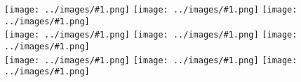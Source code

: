\documentclass{scrartcl}
\newcommand{\card}[1]{\texttt{[image: ../images/\#1.png]}}
\begin{document}
    \centering

    \card{Mystical_Space_Typhoon}%
    \card{Mystical_Space_Typhoon}%
    \card{Mystical_Space_Typhoon}
    \\[-0.34mm]
    \card{Solemn_Strike}%
    \card{Solemn_Strike}%
    \card{Solemn_Strike}
    \\[-0.34mm]
    \card{Effect_Veiler}%
    \card{Effect_Veiler}%
    \card{Effect_Veiler}
\end{document}
